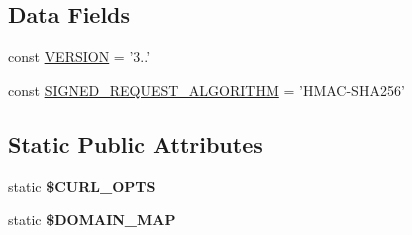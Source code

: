 \subsection*{Data Fields}
\begin{DoxyCompactItemize}
\item 
const \hyperlink{class_base_facebook_af71005841ce53adac00581ab0ba24c1f}{V\-E\-R\-S\-I\-O\-N} = '3..'
\item 
const \hyperlink{class_base_facebook_a8f8dcc1f4e368bc6d61d133ef222ded0}{S\-I\-G\-N\-E\-D\-\_\-\-R\-E\-Q\-U\-E\-S\-T\-\_\-\-A\-L\-G\-O\-R\-I\-T\-H\-M} = 'H\-M\-A\-C-\/S\-H\-A256'
\end{DoxyCompactItemize}
\subsection*{Static Public Attributes}
\begin{DoxyCompactItemize}
\item 
static {\bfseries \$\-C\-U\-R\-L\-\_\-\-O\-P\-T\-S}
\item 
static {\bfseries \$\-D\-O\-M\-A\-I\-N\-\_\-\-M\-A\-P}
\end{DoxyCompactItemize}
